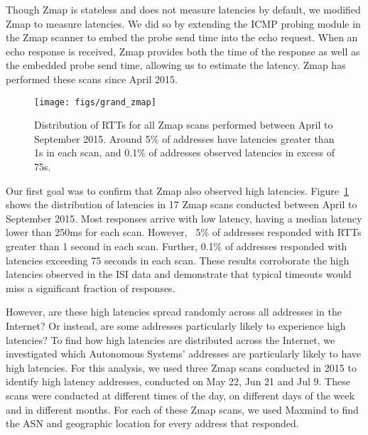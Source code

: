 Though Zmap is stateless and does not measure latencies by default, we
modified Zmap to measure latencies. We did so by extending the ICMP
probing module in the Zmap scanner to embed the probe send time into
the echo request. When an echo response is received, Zmap provides
both the time of the response as well as the embedded probe send time,
allowing us to estimate the latency. Zmap has performed these scans
since April 2015.

\begin{figure}[tb]
\begin{center}
\texttt{[image: figs/grand\_zmap]}
\end{center}
\caption{\label{fig:grand_zmap}%
Distribution of RTTs for all Zmap scans performed between April to
September 2015. Around 5\%
of addresses have latencies greater than 1s in each scan, and 0.1\% of addresses observed latencies in excess of 75s.
}
\end{figure}

Our first goal was to confirm that Zmap also observed high
latencies. Figure~\ref{fig:grand_zmap} shows the distribution of latencies in 17 Zmap scans conducted between April to
September 2015. Most responses arrive with low latency, having a median latency lower than
250ms for each scan. However, ~5\% of addresses responded with RTTs
greater than 1 second in each scan. Further, 0.1\% of addresses
responded with latencies exceeding 75 seconds in each scan. These
results corroborate the high latencies observed in the ISI data and
demonstrate that typical timeouts would miss a significant fraction of responses.

However, are these high latencies spread randomly across all addresses
in the Internet? Or instead, are some addresses particularly likely to
experience high latencies?
To find how high latencies are distributed across the Internet, we
investigated which Autonomous Systems' addresses are particularly
likely to have high latencies. For this analysis, we used three Zmap
scans conducted in 2015 to identify high latency addresses, conducted
on May 22, Jun 21 and Jul 9. These scans were conducted at different
times of the day, on different days of the week and in different
months. For each of these Zmap scans, we used Maxmind to find the ASN
and geographic location for every address that responded.

